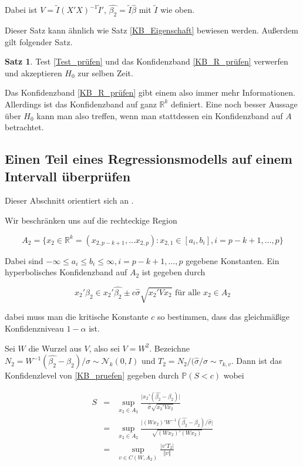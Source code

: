 \documentclass[12pt,a4paper]{article}
\theoremstyle{definition}
\theoremstyle{definition}
\newtheorem{Satz}[Definition]{Satz}
\theoremstyle{definition}
\theoremstyle{definition}
\begin{document}
Dabei ist $V=\tilde{I}(X'X)^{-1}\tilde{I}'$, $\hat{\beta_2} = \tilde{I} \hat{\beta}$ mit $\tilde{I}$ wie oben. 

Dieser Satz kann ähnlich wie Satz \ref{KB_Eigenschaft} bewiesen werden. Außerdem gilt folgender Satz.

\begin{Satz}
Test \eqref{Test_prüfen} und das Konfidenzband \eqref{KB_R_prüfen} verwerfen und akzeptieren $H_0$ zur selben Zeit.
\end{Satz}

Das Konfidenzband \eqref{KB_R_prüfen} gibt einem also immer mehr Informationen. Allerdings ist das Konfidenzband auf ganz $\mathbb{R}^k$ definiert. Eine noch besser Aussage über $H_0$ kann man also treffen, wenn man stattdessen ein Konfidenzband auf $A$ betrachtet. 

\subsection{Einen Teil eines Regressionsmodells auf einem Intervall überprüfen}
\label{Teil eines Regressionsmodells auf einem Intervall überpruefen}
Dieser Abschnitt orientiert sich an \cite[102-105]{Liu64}.

Wir beschränken uns auf die rechteckige Region

\begin{equation*}
A_2 = \{ x_2 \in \mathbb{R}^k =(x_{2,p-k+1}, \ldots x_{2,p}) : x_{2,1} \in [a_i,b_i], i=p-k+1, \ldots, p \}
\end{equation*}

Dabei sind $- \infty \leq a_i \leq b_i \leq \infty, i = p-k+1, \ldots, p$ gegebene Konstanten. Ein hyperbolisches Konfidenzband auf $A_2$ ist gegeben durch

\begin{equation}\label{KB_pruefen}
x_2'\beta_2 \in x_2'\hat{\beta_2} \pm c \hat{\sigma}\sqrt{x_2'Vx_2} \text{ für alle } x_2 \in A_2
\end{equation}

dabei muss man die kritische Konstante $c$ so bestimmen, dass das gleichmäßige Konfidenzniveau $1 - \alpha$ ist.

Sei $W$ die Wurzel aus $V$, also sei $V=W^2$. Bezeichne $N_2=W^{-1}(\hat{\beta_2}-\beta_2)/\sigma \sim \mathscr{N}_{k}(0,I)$ und $T_2 = N_2/(\hat{\sigma}/\sigma \sim \tau_{k,v}$. Dann ist das Konfidenzlevel von \eqref{KB_pruefen} gegeben durch $\mathbb{P}(S<c)$ wobei

\begin{eqnarray*}
S &=& \sup_{x_2 \in A_2} \frac{\vert x_2' (\hat{\beta_2} - \beta_2) \vert }{\hat{\sigma} \sqrt{x_2' V  x_2}} \\
&=& \sup_{x_2 \in A_2} \frac{\vert (Wx_2)'W^{-1} (\hat{\beta_2}-\beta_2)/\hat{\sigma} \vert}{\sqrt{(Wx_2)'(Wx_2)}} \\
&=& \sup_{v \in C(W,A_2)} \frac{\vert v'T_2 \vert }{\Vert v \Vert}
\end{eqnarray*}
\end{document}
